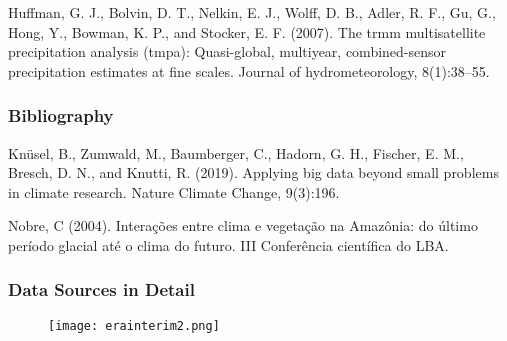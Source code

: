 \documentclass[11pt]{beamer}
\begin{document}
\begin{thebibliography}{99}
\begin{frame}
{    \bibitem{}
      Huffman, G. J., Bolvin, D. T., Nelkin, E. J., Wolff, D. B., Adler, R. F.,
      Gu, G., Hong, Y., Bowman, K. P., and Stocker, E. F. (2007). The trmm
      multisatellite precipitation analysis (tmpa): Quasi-global, multiyear,
      combined-sensor precipitation estimates at fine scales. Journal of
      hydrometeorology, 8(1):38–55.
      
    } 

  \end{frame}

  \begin{frame}
    \frametitle{\normalsize{\textbf{
          Bibliography 
    }}}

    \scriptsize{
      
    \bibitem{}
      Knüsel, B., Zumwald, M., Baumberger, C., Hadorn, G. H., Fischer, E. M.,
      Bresch, D. N., and Knutti, R. (2019). Applying big data beyond small
      problems in climate research. Nature Climate Change, 9(3):196.

    \bibitem{}
      Nobre, C (2004). Interações entre clima e vegetação na Amazônia: do último
      período glacial até o clima do futuro. III Conferência científica do LBA.
      
    }
    
  \end{frame}
  
\end{thebibliography}

\begin{frame}
  \frametitle{\normalsize{\textbf{
        Data Sources in Detail
  }}} 
    
  \begin{figure}[h!]
    \centering
    \texttt{[image: erainterim2.png]} 
  \end{figure}
  
\end{frame}
\end{document}
